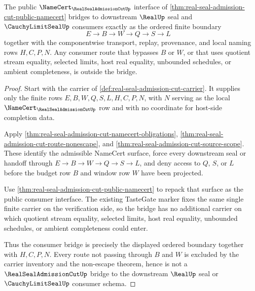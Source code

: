 \begin{theorem}
\label{thm:real-seal-admission-cut-consumer-bridge}
The public $\NameCert_{\RealSealAdmissionCutUp}$ interface of \autoref{thm:real-seal-admission-cut-public-namecert} bridges to downstream $\RealUp$ seal and $\CauchyLimitSealUp$ consumers exactly as the ordered finite boundary
$$
E \to B \to W \to Q \to S \to L
$$
together with the componentwise transport, replay, provenance, and local naming rows $H,C,P,N$. Any consumer route that bypasses $B$ or $W$, or that uses quotient stream equality, selected limits, host real equality, unbounded schedules, or ambient completeness, is outside the bridge.
\end{theorem}
\begin{proof}
Start with the carrier of \autoref{def:real-seal-admission-cut-carrier}. It supplies only the finite rows $E,B,W,Q,S,L,H,C,P,N$, with $N$ serving as the local $\NameCert_{\RealSealAdmissionCutUp}$ row and with no coordinate for host-side completion data.

Apply \autoref{thm:real-seal-admission-cut-namecert-obligations}, \autoref{thm:real-seal-admission-cut-route-nonescape}, and \autoref{thm:real-seal-admission-cut-source-scope}. These identify the admissible NameCert surface, force every downstream seal or handoff through $E \to B \to W \to Q \to S \to L$, and deny access to $Q$, $S$, or $L$ before the budget row $B$ and window row $W$ have been projected.

Use \autoref{thm:real-seal-admission-cut-public-namecert} to repack that surface as the public consumer interface. The existing TasteGate marker fixes the same single finite carrier on the verification side, so the bridge has no additional carrier on which quotient stream equality, selected limits, host real equality, unbounded schedules, or ambient completeness could enter.

Thus the consumer bridge is precisely the displayed ordered boundary together with $H,C,P,N$. Every route not passing through $B$ and $W$ is excluded by the carrier inventory and the non-escape theorem, hence is not a $\RealSealAdmissionCutUp$ bridge to the downstream $\RealUp$ seal or $\CauchyLimitSealUp$ consumer schema.
\end{proof}



